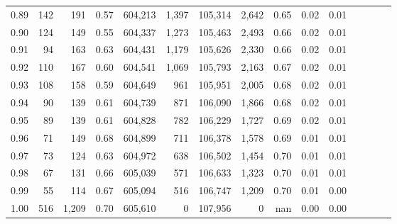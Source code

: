 \begin{tabular}{rrrcrrrrrrrrrrr}
0.89 &     142 &    191 &                                       0.57 &  604,213 &    1,397 &  105,314 &    2,642 &  0.65 &  0.02 &                         0.01 \\
0.90 &     124 &    149 &                                       0.55 &  604,337 &    1,273 &  105,463 &    2,493 &  0.66 &  0.02 &                         0.01 \\
0.91 &      94 &    163 &                                       0.63 &  604,431 &    1,179 &  105,626 &    2,330 &  0.66 &  0.02 &                         0.01 \\
0.92 &     110 &    167 &                                       0.60 &  604,541 &    1,069 &  105,793 &    2,163 &  0.67 &  0.02 &                         0.01 \\
0.93 &     108 &    158 &                                       0.59 &  604,649 &      961 &  105,951 &    2,005 &  0.68 &  0.02 &                         0.01 \\
0.94 &      90 &    139 &                                       0.61 &  604,739 &      871 &  106,090 &    1,866 &  0.68 &  0.02 &                         0.01 \\
0.95 &      89 &    139 &                                       0.61 &  604,828 &      782 &  106,229 &    1,727 &  0.69 &  0.02 &                         0.01 \\
0.96 &      71 &    149 &                                       0.68 &  604,899 &      711 &  106,378 &    1,578 &  0.69 &  0.01 &                         0.01 \\
0.97 &      73 &    124 &                                       0.63 &  604,972 &      638 &  106,502 &    1,454 &  0.70 &  0.01 &                         0.01 \\
0.98 &      67 &    131 &                                       0.66 &  605,039 &      571 &  106,633 &    1,323 &  0.70 &  0.01 &                         0.01 \\
0.99 &      55 &    114 &                                       0.67 &  605,094 &      516 &  106,747 &    1,209 &  0.70 &  0.01 &                         0.00 \\
1.00 &     516 &  1,209 &                                       0.70 &  605,610 &        0 &  107,956 &        0 &   nan &  0.00 &                         0.00 \\
\bottomrule
\end{tabular}
